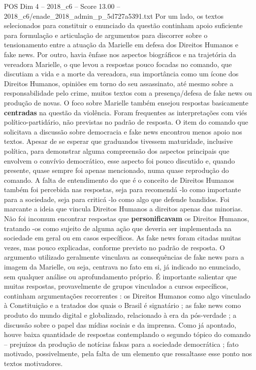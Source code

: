 \begin{textsample}{POS Dim 4 – 2018\_c6 – Score 13.00 – 2018\_c6/enade\_2018\_admin\_p\_5d727a5391.txt}
Por um lado, os textos selecionados para constituir o enunciado da questão continham apoio suficiente para formulação e articulação de argumentos para discorrer sobre o tensionamento entre a atuação da Marielle em defesa dos Direitos Humanos e fake news.
Por outro, havia ênfase nos aspectos biográficos e na trajetória da vereadora Marielle, o que levou a respostas pouco focadas no comando, que discutiam a vida e a morte da vereadora, sua importância como um ícone dos Direitos Humanos, opiniões em torno do seu assassinato, até mesmo sobre a responsabilidade pelo crime, muitos textos com a presença/defesa de fake news ou produção de novas.
O foco sobre Marielle também ensejou respostas basicamente \textbf{centradas} na questão da violência.
Foram frequentes as interpretações com viés político-partidário, não previstas no padrão de resposta.
O item do comando que solicitava a discussão sobre democracia e fake news encontrou menos apoio nos textos.
Apesar de se esperar que graduandos tivessem maturidade, inclusive política, para demonstrar alguma compreensão dos aspectos principais que envolvem o convívio democrático, esse aspecto foi pouco discutido e, quando presente, quase sempre foi apenas mencionado, numa quase reprodução do comando.
A falta de entendimento do que é o conceito de Direitos Humanos também foi percebida nas respostas, seja para recomendá -lo como importante para a sociedade, seja para criticá -lo como algo que defende bandidos.
Foi marcante a ideia que vincula Direitos Humanos a direitos apenas das minorias.
Não foi incomum encontrar respostas que \textbf{personificavam} os Direitos Humanos, tratando -os como sujeito de alguma ação que deveria ser implementada na sociedade em geral ou em casos específicos.
As fake news foram citadas muitas vezes, mas pouco explicadas, conforme previsto no padrão de resposta.
O argumento utilizado geralmente vinculava as consequências de fake news para a imagem da Marielle, ou seja, centrava no fato em si, já indicado no enunciado, sem qualquer análise ou aprofundamento próprio.
É importante salientar que muitas respostas, provavelmente de grupos vinculados a cursos específicos, continham argumentações recorrentes : os Direitos Humanos como algo vinculado à Constituição e a tratados dos quais o Brasil é signatário ; as fake news como produto do mundo digital e globalizado, relacionado à era da pós-verdade ; a discussão sobre o papel das mídias sociais e da imprensa.
Como já apontado, houve baixa quantidade de respostas contemplando o segundo tópico do comando – prejuízos da produção de notícias falsas para a sociedade democrática ; fato motivado, possivelmente, pela falta de um elemento que ressaltasse esse ponto nos textos motivadores.

\end{textsample}
